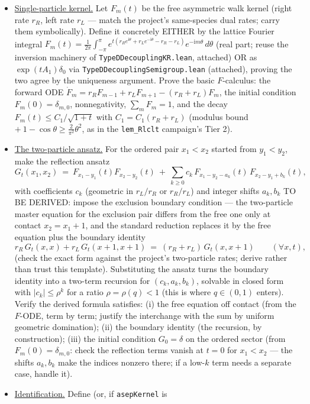 \documentclass[11pt]{article}
\theoremstyle{plain}
\theoremstyle{remark}
\begin{document}
\begin{itemize}
\item[(1)] \underline{Single-particle kernel.} Let $F_m(t)$ be the free
asymmetric walk kernel (right rate $r_R$, left rate $r_L$ --- match the
project's same-species dual rates; carry them symbolically). Define it
concretely EITHER by the lattice Fourier integral
$F_m(t)=\frac1{2\pi}\int_{-\pi}^{\pi}
e^{t(r_Re^{\mathrm i\theta}+r_Le^{-\mathrm i\theta}-r_R-r_L)}
e^{-\mathrm im\theta}\,d\theta$ (real part; reuse the inversion machinery of
\texttt{TypeDDecouplingKR.lean}, attached) OR as
$\exp(tA_1)\delta_0$ via \texttt{TypeDDecouplingSemigroup.lean} (attached),
proving the two agree by the uniqueness argument. Prove the basic $F$-calculus:
the forward ODE $\dot F_m=r_RF_{m-1}+r_LF_{m+1}-(r_R+r_L)F_m$, the initial
condition $F_m(0)=\delta_{m,0}$, nonnegativity, $\sum_mF_m=1$, and the decay
$F_m(t)\le C_1/\sqrt{1+t}$ with $C_1=C_1(r_R+r_L)$ (modulus bound
$+\ 1-\cos\theta\ge\tfrac2{\pi^2}\theta^2$, as in the \texttt{lem\_Rlclt}
campaign's Tier 2).
\item[(2)] \underline{The two-particle ansatz.} For the ordered pair
$x_1<x_2$ started from $y_1<y_2$, make the reflection ansatz
\[
  G_t(x_1,x_2)\ =\ F_{x_1-y_1}(t)F_{x_2-y_2}(t)
  \ +\ \sum_{k\ge0}c_k\,F_{x_1-y_2-a_k}(t)\,F_{x_2-y_1+b_k}(t),
\]
with coefficients $c_k$ (geometric in $r_L/r_R$ or $r_R/r_L$) and integer
shifts $a_k,b_k$ TO BE DERIVED: impose the exclusion boundary condition ---
the two-particle master equation for the exclusion pair differs from the free
one only at contact $x_2=x_1+1$, and the standard reduction replaces it by the
free equation plus the boundary identity
\[
  r_R\,G_t(x,x)+r_L\,G_t(x+1,x+1)\ =\ (r_R+r_L)\,G_t(x,x+1)
  \qquad(\forall x,t),
\]
(check the exact form against the project's two-particle rates; derive rather
than trust this template). Substituting the ansatz turns the boundary identity
into a two-term recursion for $(c_k,a_k,b_k)$, solvable in closed form with
$|c_k|\le\rho^k$ for a ratio $\rho=\rho(q)<1$ (this is where $q\in(0,1)$
enters). Verify the derived formula satisfies: (i) the free equation off
contact (from the $F$-ODE, term by term; justify the interchange with the sum
by uniform geometric domination); (ii) the boundary identity (the recursion,
by construction); (iii) the initial condition $G_0=\delta$ on the ordered
sector (from $F_m(0)=\delta_{m,0}$: check the reflection terms vanish at
$t=0$ for $x_1<x_2$ --- the shifts $a_k,b_k$ make the indices nonzero there;
if a low-$k$ term needs a separate case, handle it).
\item[(3)] \underline{Identification.} Define (or, if \texttt{asepKernel} is

\end{itemize}
\end{document}
